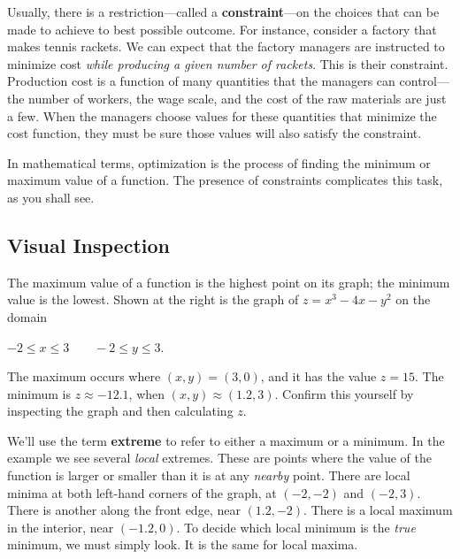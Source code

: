 {{{{        Usually, there is a restriction---called a {\bf constraint}---on the choices that can be made to achieve to best possible outcome.  
For instance, consider a factory that makes tennis rackets.  We can expect that the factory managers are instructed to minimize cost {\em while producing a given number of rackets}.  This is their constraint.  Production cost is a function of many quantities that the managers can control---the number of workers, the wage scale, and the cost of the raw materials are just a few.  When the managers choose values for these quantities that minimize the cost function, they must be sure those values will also satisfy the constraint.   

        In mathematical terms, optimization 
is the process of finding the minimum or maximum value of a function.  The presence of constraints complicates this task, as you shall see.

\subsection{Visual Inspection}


\noindent
The maximum value of a function is the highest point on its graph; the minimum value is the lowest.  Shown at the right is the graph of $z = x^3 - 4x - y^2$ on the domain

\vspace{-7pt}
\begin{center}
        $-2 \leq x \leq 3 \qquad -2 \leq y \leq 3$.
\end{center}
\vspace{-7pt}

The maximum occurs where $(x, y) = (3, 0)$, and it has the value $z = 15$.  The minimum is $z \approx -12.1$, when $(x, y) \approx (1.2, 3)$.  Confirm this yourself by inspecting the graph and then calculating $z$.

        We'll use the term {\bf extreme} 
to refer to either a maximum or a minimum.   In the example we see several {\em local\/} extremes.  These are points where the value of the function is larger or smaller than it is at any {\em nearby\/} point.  There are local minima at both left-hand corners of the graph, at $(-2, -2)$ and $(-2, 3)$.  There is another along the front edge, near $(1.2, -2)$.  There is a local maximum in the interior, near $(-1.2, 0)$.  To decide which local minimum is the {\em true\/} minimum, we must simply look.  It is the same for local maxima.

}}}}
